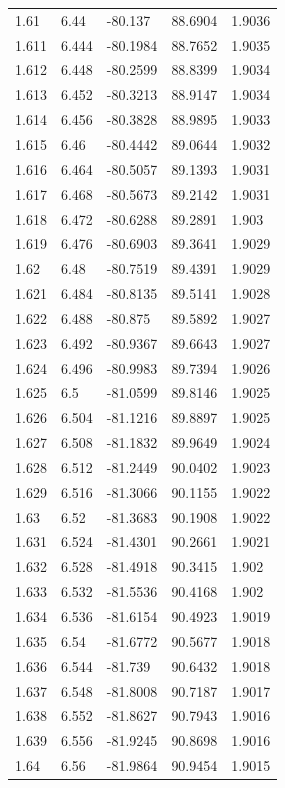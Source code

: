 \begin{tabular}{lllll}
1.61 & 6.44 & -80.137 & 88.6904 & 1.9036 \\
1.611 & 6.444 & -80.1984 & 88.7652 & 1.9035 \\
1.612 & 6.448 & -80.2599 & 88.8399 & 1.9034 \\
1.613 & 6.452 & -80.3213 & 88.9147 & 1.9034 \\
1.614 & 6.456 & -80.3828 & 88.9895 & 1.9033 \\
1.615 & 6.46 & -80.4442 & 89.0644 & 1.9032 \\
1.616 & 6.464 & -80.5057 & 89.1393 & 1.9031 \\
1.617 & 6.468 & -80.5673 & 89.2142 & 1.9031 \\
1.618 & 6.472 & -80.6288 & 89.2891 & 1.903 \\
1.619 & 6.476 & -80.6903 & 89.3641 & 1.9029 \\
1.62 & 6.48 & -80.7519 & 89.4391 & 1.9029 \\
1.621 & 6.484 & -80.8135 & 89.5141 & 1.9028 \\
1.622 & 6.488 & -80.875 & 89.5892 & 1.9027 \\
1.623 & 6.492 & -80.9367 & 89.6643 & 1.9027 \\
1.624 & 6.496 & -80.9983 & 89.7394 & 1.9026 \\
1.625 & 6.5 & -81.0599 & 89.8146 & 1.9025 \\
1.626 & 6.504 & -81.1216 & 89.8897 & 1.9025 \\
1.627 & 6.508 & -81.1832 & 89.9649 & 1.9024 \\
1.628 & 6.512 & -81.2449 & 90.0402 & 1.9023 \\
1.629 & 6.516 & -81.3066 & 90.1155 & 1.9022 \\
1.63 & 6.52 & -81.3683 & 90.1908 & 1.9022 \\
1.631 & 6.524 & -81.4301 & 90.2661 & 1.9021 \\
1.632 & 6.528 & -81.4918 & 90.3415 & 1.902 \\
1.633 & 6.532 & -81.5536 & 90.4168 & 1.902 \\
1.634 & 6.536 & -81.6154 & 90.4923 & 1.9019 \\
1.635 & 6.54 & -81.6772 & 90.5677 & 1.9018 \\
1.636 & 6.544 & -81.739 & 90.6432 & 1.9018 \\
1.637 & 6.548 & -81.8008 & 90.7187 & 1.9017 \\
1.638 & 6.552 & -81.8627 & 90.7943 & 1.9016 \\
1.639 & 6.556 & -81.9245 & 90.8698 & 1.9016 \\
1.64 & 6.56 & -81.9864 & 90.9454 & 1.9015 \\

\end{tabular}
